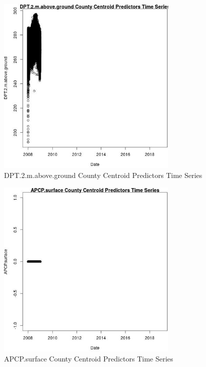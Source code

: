 \begin{figure} 
\centering  
\includegraphics[width=0.77\textwidth]{Code_Outputs/df_report_ML_predictors_CountyCentroid_Locations_Dates_2008-01-01to2018-12-31_DPT2mabovegroundvDate.jpg} 
\caption{\label{fig:df_report_ML_predictors_CountyCentroid_Locations_Dates_2008-01-01to2018-12-31DPT2mabovegroundvDate}DPT.2.m.above.ground County Centroid Predictors Time Series} 
\end{figure} 
 

\begin{figure} 
\centering  
\includegraphics[width=0.77\textwidth]{Code_Outputs/df_report_ML_predictors_CountyCentroid_Locations_Dates_2008-01-01to2018-12-31_APCPsurfacevDate.jpg} 
\caption{\label{fig:df_report_ML_predictors_CountyCentroid_Locations_Dates_2008-01-01to2018-12-31APCPsurfacevDate}APCP.surface County Centroid Predictors Time Series} 
\end{figure} 
 

